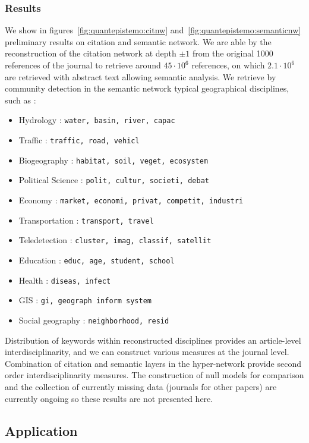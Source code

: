 \subsubsection{Results}


We show in figures~\ref{fig:quantepistemo:citnw} and~\ref{fig:quantepistemo:semanticnw} preliminary results on citation and semantic network. We are able by the reconstruction of the citation network at depth $\pm 1$ from the original 1000 references of the journal to retrieve around $45\cdot 10^6$ references, on which $2.1\cdot 10^6$ are retrieved with abstract text allowing semantic analysis. We retrieve by community detection in the semantic network typical geographical disciplines, such as :

\begin{itemize}
\item Hydrology : \texttt{water, basin, river, capac}
\item Traffic : \texttt{traffic, road, vehicl}
\item Biogeography : \texttt{habitat, soil, veget, ecosystem}
\item Political Science : \texttt{polit, cultur, societi, debat}
\item Economy : \texttt{market, economi, privat, competit, industri}
\item Transportation : \texttt{transport, travel}
\item Teledetection : \texttt{cluster, imag, classif, satellit}
\item Education : \texttt{educ, age, student, school}
\item Health : \texttt{diseas, infect}
\item GIS : \texttt{gi, geograph inform system}
\item Social geography : \texttt{neighborhood, resid}
\end{itemize}



Distribution of keywords within reconstructed disciplines provides an article-level interdisciplinarity, and we can construct various measures at the journal level. Combination of citation and semantic layers in the hyper-network provide second order interdisciplinarity measures. The construction of null models for comparison and the collection of currently missing data (journals for other papers) are currently ongoing so these results are not presented here.



\subsection{Application}


